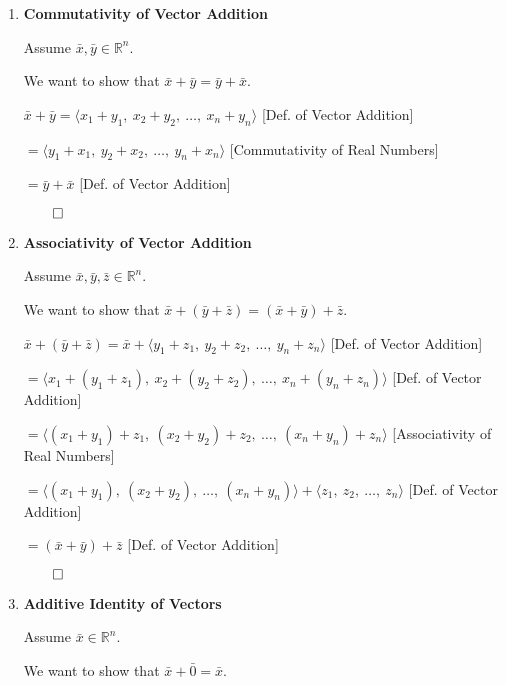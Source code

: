 
\begin{proofbox}
\begin{enumerate}[label=\arabic*., resume=vecprops]

\item \textbf{Commutativity of Vector Addition}

Assume $\bar{x}, \bar{y} \in \mathbb{R}^n$. 

We want to show that $\bar{x} + \bar{y} = \bar{y} + \bar{x}$.

\quad $\bar{x} + \bar{y} = \langle x_1 + y_1,\ x_2 + y_2,\ \ldots,\ x_n + y_n \rangle$ \hfill [Def. of Vector Addition]

\quad $= \langle y_1 + x_1,\ y_2 + x_2,\ \ldots,\ y_n + x_n \rangle$ \hfill [Commutativity of Real Numbers]

\quad $= \bar{y} + \bar{x}$ \hfill [Def. of Vector Addition]

\hfill $\qed$

\item \textbf{Associativity of Vector Addition}

Assume $\bar{x}, \bar{y}, \bar{z} \in \mathbb{R}^n$. 

We want to show that $\bar{x} + (\bar{y} + \bar{z}) = (\bar{x} + \bar{y}) + \bar{z}$.

\quad $\bar{x} + (\bar{y} + \bar{z}) = \bar{x} + \langle y_1 + z_1,\ y_2 + z_2,\ \ldots,\ y_n + z_n \rangle$ \hfill [Def. of Vector Addition]

\quad $= \langle x_1 + (y_1 + z_1),\ x_2 + (y_2 + z_2),\ \ldots,\ x_n + (y_n + z_n) \rangle$ \hfill [Def. of Vector Addition]

\quad $= \langle (x_1 + y_1) + z_1,\ (x_2 + y_2) + z_2,\ \ldots,\ (x_n + y_n) + z_n \rangle$ [Associativity of Real Numbers]

\quad $= \langle (x_1 + y_1),\ (x_2 + y_2),\ \ldots,\ (x_n + y_n) \rangle + \langle z_1,\ z_2,\ \ldots,\ z_n \rangle$ \hfill [Def. of Vector Addition]

\quad $= (\bar{x} + \bar{y}) + \bar{z}$ \hfill [Def. of Vector Addition]

\hfill $\qed$

\item \textbf{Additive Identity of Vectors}

Assume $\bar{x} \in \mathbb{R}^n$. 

We want to show that $\bar{x} + \bar{0} = \bar{x}$.


\end{enumerate}
\end{proofbox}

